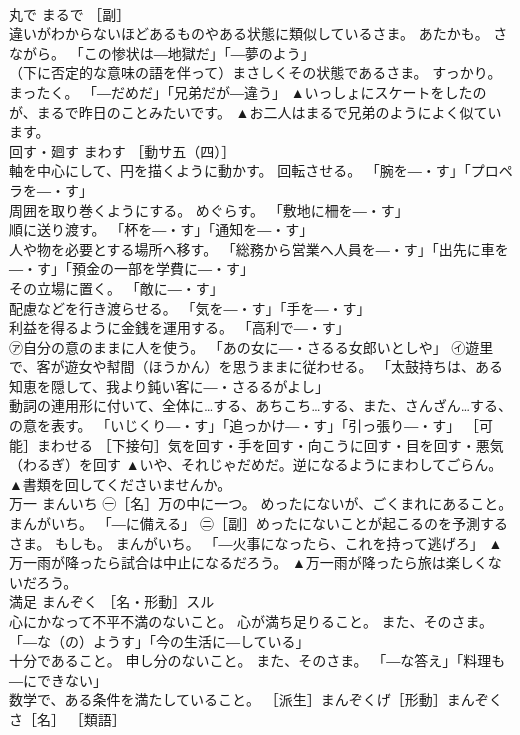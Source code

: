 \documentclass[8pt]{extreport}
\begin{document}
\begin{CJK}{UTF8}{min}
\\	丸で	まるで	［副］ 
\\	違いがわからないほどあるものやある状態に類似しているさま。 あたかも。 さながら。 「この惨状は―地獄だ」「―夢のよう」 
\\	（下に否定的な意味の語を伴って）まさしくその状態であるさま。 すっかり。 まったく。 「―だめだ」「兄弟だが―違う」	▲いっしょにスケートをしたのが、まるで昨日のことみたいです。 ▲お二人はまるで兄弟のようによく似ています。
\\	回す・廻す	まわす	［動サ五（四）］ 
\\	軸を中心にして、円を描くように動かす。 回転させる。 「腕を―・す」「プロペラを―・す」 
\\	周囲を取り巻くようにする。 めぐらす。 「敷地に柵を―・す」 
\\	順に送り渡す。 「杯を―・す」「通知を―・す」 
\\	人や物を必要とする場所へ移す。 「総務から営業へ人員を―・す」「出先に車を―・す」「預金の一部を学費に―・す」 
\\	その立場に置く。 「敵に―・す」 
\\	配慮などを行き渡らせる。 「気を―・す」「手を―・す」 
\\	利益を得るように金銭を運用する。 「高利で―・す」 
\\	㋐自分の意のままに人を使う。 「あの女に―・さるる女郎いとしや」 ㋑遊里で、客が遊女や幇間（ほうかん）を思うままに従わせる。 「太鼓持ちは、ある知恵を隠して、我より鈍い客に―・さるるがよし」 
\\	動詞の連用形に付いて、全体に…する、あちこち…する、また、さんざん…する、の意を表す。 「いじくり―・す」「追っかけ―・す」「引っ張り―・す」 ［可能］まわせる ［下接句］気を回す・手を回す・向こうに回す・目を回す・悪気（わるぎ）を回す	▲いや、それじゃだめだ。逆になるようにまわしてごらん。 ▲書類を回してくださいませんか。
\\	万一	まんいち	㊀［名］万の中に一つ。 めったにないが、ごくまれにあること。 まんがいち。 「―に備える」 ㊁［副］めったにないことが起こるのを予測するさま。 もしも。 まんがいち。 「―火事になったら、これを持って逃げろ」	▲万一雨が降ったら試合は中止になるだろう。 ▲万一雨が降ったら旅は楽しくないだろう。
\\	満足	まんぞく	［名・形動］スル 
\\	心にかなって不平不満のないこと。 心が満ち足りること。 また、そのさま。 「―な（の）ようす」「今の生活に―している」 
\\	十分であること。 申し分のないこと。 また、そのさま。 「―な答え」「料理も―にできない」 
\\	数学で、ある条件を満たしていること。 ［派生］まんぞくげ［形動］まんぞくさ［名］ ［類語］

\end{CJK}
\end{document}
